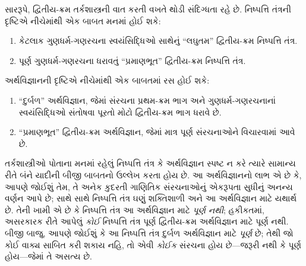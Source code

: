 સારરૂપે, દ્વિતીય-ક્રમ તર્કશાસ્ત્રની વાત કરતી વખતે થોડી સંદિગ્ધતા રહે છે.
નિષ્પત્તિ તંત્રની દૃષ્ટિએ નીચેમાંથી એક બાબત મનમાં હોઈ શકે:
\begin{enumerate}
\item કેટલાક ગુણધર્મ-ગણરચના સ્વયંસિદ્ધિઓ સાથેનું ``લઘુતમ'' દ્વિતીય-ક્રમ
  નિષ્પત્તિ તંત્ર.
\item પૂર્ણ ગુણધર્મ-ગણરચના ધરાવતું ``પ્રમાણભૂત'' દ્વિતીય-ક્રમ
  નિષ્પત્તિ તંત્ર.
\end{enumerate}
અર્થવિજ્ઞાનની દૃષ્ટિએ નીચેમાંથી એક બાબતમાં રસ હોઈ શકે:
\begin{enumerate}
\item ``દુર્બળ'' અર્થવિજ્ઞાન, જેમાં સંરચના પ્રથમ-ક્રમ ભાગ અને
  ગુણધર્મ-ગણરચનાનાં સ્વયંસિદ્ધિઓ સંતોષવા પૂરતો મોટો દ્વિતીય-ક્રમ ભાગ
  ધરાવે છે.
\item ``પ્રમાણભૂત'' દ્વિતીય-ક્રમ અર્થવિજ્ઞાન, જેમાં માત્ર પૂર્ણ
  સંરચનાઓને વિચારવામાં આવે છે.
\end{enumerate}
તર્કશાસ્ત્રીઓ પોતાના મનમાં રહેલું નિષ્પત્તિ તંત્ર કે અર્થવિજ્ઞાન
સ્પષ્ટ ન કરે ત્યારે સામાન્ય રીતે બંને યાદીની બીજી બાબતનો ઉલ્લેખ કરતા
હોય છે. આ અર્થવિજ્ઞાનનો લાભ એ છે કે, આપણે જોઈશું તેમ, તે અનેક કુદરતી
ગાણિતિક સંરચનાઓનું એકરૂપતા સુધીનું અનન્ય વર્ણન આપે છે; સાથે સાથે
નિષ્પત્તિ તંત્ર ઘણું શક્તિશાળી અને આ અર્થવિજ્ઞાન માટે યથાર્થ છે.
તેની ખામી એ છે કે નિષ્પત્તિ તંત્ર આ અર્થવિજ્ઞાન માટે \emph{પૂર્ણ
નથી}; હકીકતમાં, અસરકારક રીતે આપેલું \emph{કોઈ} નિષ્પત્તિ તંત્ર
પૂર્ણ દ્વિતીય-ક્રમ અર્થવિજ્ઞાન માટે પૂર્ણ નથી. બીજી બાજુ, આપણે જોઈશું
કે આ નિષ્પત્તિ તંત્ર દુર્બળ અર્થવિજ્ઞાન માટે \emph{પૂર્ણ} છે; તેથી
જો કોઈ વાક્ય સાબિત કરી શકાય નહિ, તો એવી \emph{કોઈક} સંરચના
હોય છે---જરૂરી નથી કે પૂર્ણ હોય---જેમાં તે અસત્ય છે.

